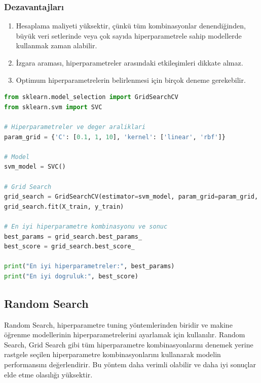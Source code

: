 \subsubsection{Dezavantajları}
\begin{enumerate}
    \item Hesaplama maliyeti yüksektir, çünkü tüm kombinasyonlar denendiğinden, büyük veri setlerinde veya çok sayıda hiperparametrele sahip modellerde kullanmak zaman alabilir.
    \item İzgara araması, hiperparametreler arasındaki etkileşimleri dikkate almaz.
    \item Optimum hiperparametrelerin belirlenmesi için birçok deneme gerekebilir.
\end{enumerate}

\begin{lstlisting}[language=Python]
from sklearn.model_selection import GridSearchCV
from sklearn.svm import SVC

# Hiperparametreler ve deger araliklari
param_grid = {'C': [0.1, 1, 10], 'kernel': ['linear', 'rbf']}

# Model
svm_model = SVC()

# Grid Search
grid_search = GridSearchCV(estimator=svm_model, param_grid=param_grid, cv=5, scoring='accuracy')
grid_search.fit(X_train, y_train)

# En iyi hiperparametre kombinasyonu ve sonuc
best_params = grid_search.best_params_
best_score = grid_search.best_score_

print("En iyi hiperparametreler:", best_params)
print("En iyi dogruluk:", best_score)
\end{lstlisting}

\newpage

\subsection{Random Search}
Random Search, hiperparametre tuning yöntemlerinden biridir ve makine öğrenme modellerinin hiperparametrelerini ayarlamak için kullanılır. Random Search, Grid Search gibi tüm hiperparametre kombinasyonlarını denemek yerine rastgele seçilen hiperparametre kombinasyonlarını kullanarak modelin performansını değerlendirir. Bu yöntem daha verimli olabilir ve daha iyi sonuçlar elde etme olasılığı yüksektir.

